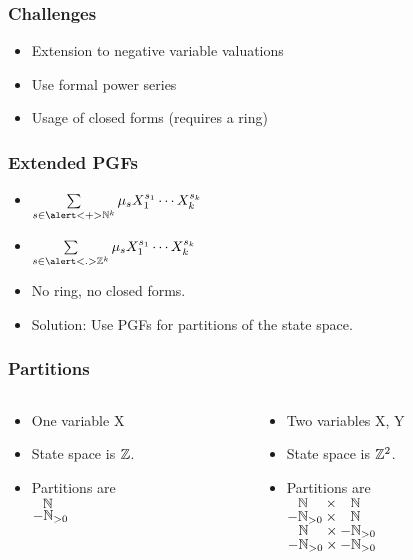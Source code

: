 \begin{frame}
	\frametitle{Challenges}
	\begin{itemize}
		\itemspacing{20pt}
		\item<1-> Extension to negative variable valuations
		\item<2-> Use formal power series
		\item<3-> Usage of closed forms (requires a ring)
	\end{itemize}
\end{frame}

\begin{frame}
	\frametitle{Extended PGFs}
	\begin{itemize}[<+->]
		\itemspacing{20pt}
		\item $ \sum\limits_{s \in \alert<+>{\N^k} } \mu_s \Xok $
		\item $ \sum\limits_{s \in \alert<.>{\Z^k} } \mu_s \Xok $
		\item No ring, no closed forms.
		\item Solution: Use PGFs for partitions of the state space.
	\end{itemize}
\end{frame}

\begin{frame}
	\frametitle{Partitions}
	\begin{columns}
		\begin{column}{0.5\textwidth}
			\begin{itemize}
				\itemspacing{10pt}
				\item<1-> One variable X
				\item<2-> State space is $\mathbb{Z}$.
				\item<3-> Partitions are \\
					$\phantom{-}\mathbb{N}$ \\
					$-\mathbb{N}_{> 0}$ \\
					$\phantom{\N}$ \\ %
					$\phantom{\N}$
			\end{itemize}
		\end{column}
		\begin{column}{0.5\textwidth}
			\begin{itemize}
				\itemspacing{10pt}
				\item<4-> Two variables X, Y
				\item<5-> State space is $\mathbb{Z}^2$.
				\item<6-> Partitions are \\
					$\phantom{-}\mathbb{N}_{\phantom{> 0}} \times \phantom{-}\mathbb{N}  $  \\
					$          -\mathbb{N}_{> 0}				   \times \phantom{-}\mathbb{N}  $  \\
					$\phantom{-}\mathbb{N}_{\phantom{> 0}} \times           -\mathbb{N}_{> 0}$  \\
					$          -\mathbb{N}_{> 0}				   \times           -\mathbb{N}_{> 0}$
			\end{itemize}
		\end{column}
	\end{columns}
\end{frame}

